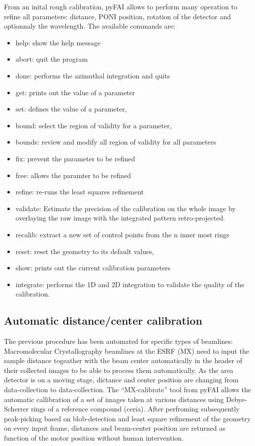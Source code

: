 \documentclass[preprint]{iucr}
\begin{document}
From an inital rough calibration, pyFAI allows to perform many operation to
refine all parameters: distance, PONI position, rotation of the detector and
optionnaly the wavelength. The available commands are:
\begin{itemize}
\item help: show the help message
\item abort: quit the program
\item done: performs the azimuthal integration and quits
\item get: prints out the value of a parameter 
\item set: defines the value of a parameter,  
\item bound: select the region of validity for a parameter, 
\item bounds: review and modify all region of validity for all parameters
\item fix: prevent the parameter to be refined 
\item free: allows the paramter to be refined 
\item refine: re-runs the least squares refinement
\item validate: Estimate the precision of the calibration on the whole
image by overlaying the raw image with the integrated pattern retro-projected.
\item recalib: extract a new set of control points from the n inner most rings
\item reset: reset the geometry to its default values,
\item show: prints out the current calibration parameters
\item integrate: performs the 1D and 2D integration to validate the quality of
the calibration.
\end{itemize}

\subsection{Automatic distance/center calibration}
The previous procedure has been automated for specific types of beamlines: 
Macromolecular Crystallography beamlines at the ESRF (MX) need to input the
sample distance togeather with the beam center automatically in the header of
their collected images to be able to process them automatically.
As the area detector is on a moving stage, dictance and center position are
changing from data-collection to data-collection.
The ``MX-calibrate'' tool from pyFAI allows the automatic callibration of
a set of images taken at various distances using Debye-Scherrer rings of a
reference compound (ceria).
After perfroming subsequently peak-picking based on blob-detection and least
square refinement of the geometry on every input frame, distances and
beam-center position are returned as function of the motor position without
human intervention.
\end{document}

